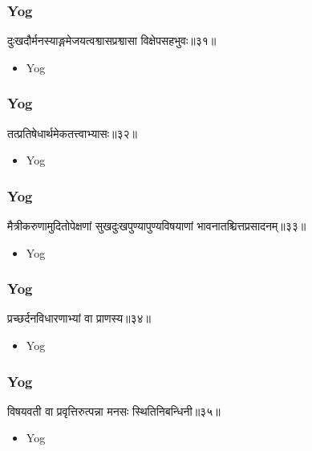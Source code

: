 \begin{frame}[fragile]\frametitle{Yog}
\begin{sanskrit}
दुःखदौर्मनस्याङ्गमेजयत्वश्वासप्रश्वासा विक्षेपसहभुवः॥३१॥
\end{sanskrit}
	\begin{itemize}
	\item Yog 
	\end{itemize}
\end{frame}



\begin{frame}[fragile]\frametitle{Yog}
\begin{sanskrit}
तत्प्रतिषेधार्थमेकतत्त्वाभ्यासः॥३२॥
\end{sanskrit}
	\begin{itemize}
	\item Yog 
	\end{itemize}
\end{frame}



\begin{frame}[fragile]\frametitle{Yog}
\begin{sanskrit}
मैत्रीकरुणामुदितोपेक्षणां सुखदुःखपुण्यापुण्यविषयाणां भावनातश्चित्तप्रसादनम्॥३३॥
\end{sanskrit}
	\begin{itemize}
	\item Yog 
	\end{itemize}
\end{frame}


\begin{frame}[fragile]\frametitle{Yog}
\begin{sanskrit}
प्रच्छर्दनविधारणाभ्यां वा प्राणस्य॥३४॥
\end{sanskrit}
	\begin{itemize}
	\item Yog 
	\end{itemize}
\end{frame}


\begin{frame}[fragile]\frametitle{Yog}
\begin{sanskrit}
विषयवती वा प्रवृत्तिरुत्पन्ना मनसः स्थितिनिबन्धिनी॥३५॥
\end{sanskrit}
	\begin{itemize}
	\item Yog 
	\end{itemize}
\end{frame}





